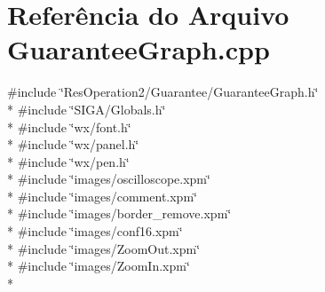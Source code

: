 \section{Referência do Arquivo Guarantee\+Graph.\+cpp}
\label{_guarantee_graph_8cpp}
{\ttfamily \#include \char`\"{}Res\+Operation2/\+Guarantee/\+Guarantee\+Graph.\+h\char`\"{}}\\*
{\ttfamily \#include \char`\"{}S\+I\+G\+A/\+Globals.\+h\char`\"{}}\\*
{\ttfamily \#include \char`\"{}wx/font.\+h\char`\"{}}\\*
{\ttfamily \#include \char`\"{}wx/panel.\+h\char`\"{}}\\*
{\ttfamily \#include \char`\"{}wx/pen.\+h\char`\"{}}\\*
{\ttfamily \#include \char`\"{}images/oscilloscope.\+xpm\char`\"{}}\\*
{\ttfamily \#include \char`\"{}images/comment.\+xpm\char`\"{}}\\*
{\ttfamily \#include \char`\"{}images/border\+\_\+remove.\+xpm\char`\"{}}\\*
{\ttfamily \#include \char`\"{}images/conf16.\+xpm\char`\"{}}\\*
{\ttfamily \#include \char`\"{}images/\+Zoom\+Out.\+xpm\char`\"{}}\\*
{\ttfamily \#include \char`\"{}images/\+Zoom\+In.\+xpm\char`\"{}}\\*
